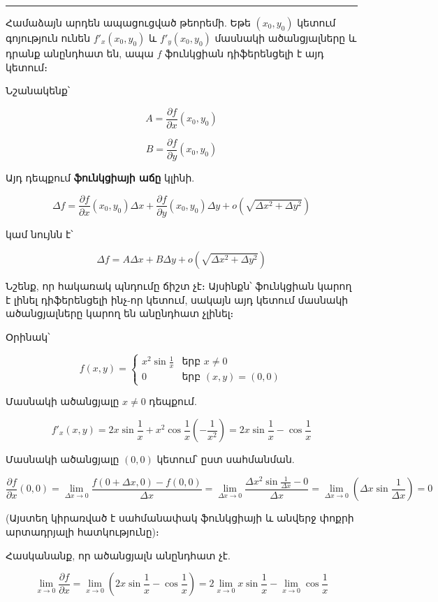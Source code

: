 \documentclass[12pt, a4paper]{article}
\begin{document}
\tableofcontents
\vspace{2em}
\hrule
\vspace{2em}

Համաձայն արդեն ապացուցված թեորեմի. Եթե $(x_0, y_0)$ կետում գոյություն ունեն $f'_x(x_0, y_0)$ և $f'_y(x_0, y_0)$ մասնակի ածանցյալները և դրանք անընդհատ են, ապա $f$ ֆունկցիան դիֆերենցելի է այդ կետում։

Նշանակենք՝

$$A = \frac{\partial f}{\partial x}(x_0, y_0)$$

$$B = \frac{\partial f}{\partial y}(x_0, y_0)$$

Այդ դեպքում \textbf{ֆունկցիայի աճը} կլինի.

$$\Delta f = \frac{\partial f}{\partial x}(x_0, y_0)\Delta x + \frac{\partial f}{\partial y}(x_0, y_0)\Delta y + o(\sqrt{\Delta x^2 + \Delta y^2})$$

կամ նույնն է՝

$$\Delta f = A\Delta x + B\Delta y + o(\sqrt{\Delta x^2 + \Delta y^2})$$

Նշենք, որ հակառակ պնդումը ճիշտ չէ։ Այսինքն՝ ֆունկցիան կարող է լինել դիֆերենցելի ինչ-որ կետում, սակայն այդ կետում մասնակի ածանցյալները կարող են անընդհատ չլինել։

Օրինակ՝

$$f(x, y) = \begin{cases} x^2 \sin \frac{1}{x} & \text{երբ } x \neq 0 \\ 0 & \text{երբ } (x, y) = (0, 0) \end{cases}$$

Մասնակի ածանցյալը $x \neq 0$ դեպքում.

$$f'_x(x, y) = 2x \sin \frac{1}{x} + x^2 \cos \frac{1}{x} \left(-\frac{1}{x^2}\right) = 2x \sin \frac{1}{x} - \cos \frac{1}{x}$$

Մասնակի ածանցյալը $(0, 0)$ կետում՝ ըստ սահմանման.

$$\frac{\partial f}{\partial x}(0, 0) = \lim_{\Delta x \to 0} \frac{f(0 + \Delta x, 0) - f(0, 0)}{\Delta x} = \lim_{\Delta x \to 0} \frac{\Delta x^2 \sin \frac{1}{\Delta x} - 0}{\Delta x} = \lim_{\Delta x \to 0} \left(\Delta x \sin \frac{1}{\Delta x}\right) = 0$$

(Այստեղ կիրառված է սահմանափակ ֆունկցիայի և անվերջ փոքրի արտադրյալի հատկությունը)։

Հասկանանք, որ ածանցյալն անընդհատ չէ.

$$\lim_{x \to 0} \frac{\partial f}{\partial x} = \lim_{x \to 0} \left(2x \sin \frac{1}{x} - \cos \frac{1}{x}\right) = 2 \lim_{x \to 0} x \sin \frac{1}{x} - \lim_{x \to 0} \cos \frac{1}{x}$$
\end{document}
